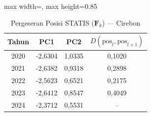 \begin{table}[H]
\centering
\caption{Pergeseran Posisi STATIS ($\mathbf{F}_k$) --- Cirebon} \label{tab:app1jarak_statis_skor_cirebon}
\begin{adjustbox}{max width=\textwidth, max height=0.85\textheight}
\begin{tabular}{|c|c|c|c|}
\hline
\textbf{Tahun} & \textbf{PC1} & \textbf{PC2} & \textbf{$D(\text{pos}_t, \text{pos}_{t+1})$} \\
\hline
2020 & -2,6304 & 1,0335 & 0,1020 \\
2021 & -2,6382 & 0,9318 & 0,2898 \\
2022 & -2,5623 & 0,6521 & 0,2175 \\
2023 & -2,6412 & 0,8547 & 0,4049 \\
2024 & -2,3712 & 0,5531 & -- \\
\hline
\end{tabular}
\end{adjustbox}
\end{table}